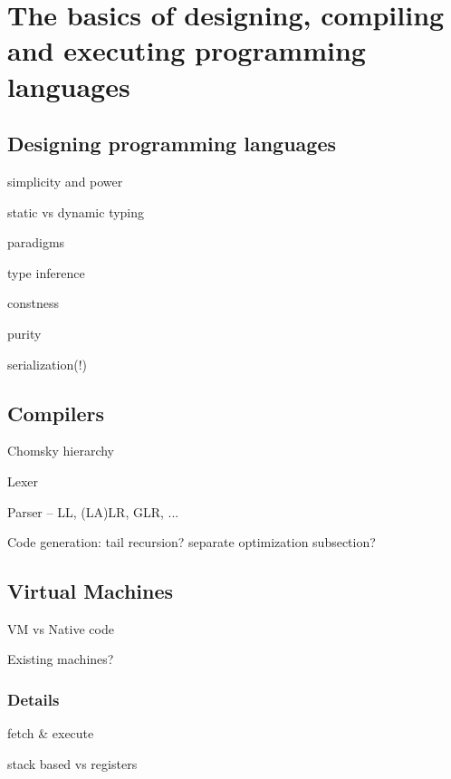 \chapter{The basics of designing, compiling and executing programming languages}


    \section{Designing programming languages}
    
        simplicity and power
        
        static vs dynamic typing
        
        paradigms
        
        type inference
        
        constness
        
        purity
        
        serialization(!)
    
    \section{Compilers}
    
        Chomsky hierarchy
        
        Lexer
        
        Parser -- LL, (LA)LR, GLR, ...
        
        Code generation: tail recursion? separate optimization subsection?
    
    \section{Virtual Machines}
    
        VM vs Native code
        
        Existing machines?
        
        \subsection{Details} %
            fetch \& execute
            
            stack based vs registers
            
